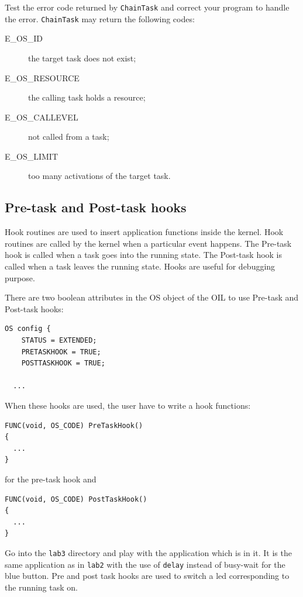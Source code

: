 \documentclass[11pt]{article}
\begin{document}
Test the error code returned by \texttt{ChainTask} and correct your program to
handle the error. \texttt{ChainTask} may return the following codes:

\begin{description}
\item[E_OS_ID] the target task does not exist;
\item[E_OS_RESOURCE] the calling task holds a resource;
\item[E_OS_CALLEVEL] not called from a task;
\item[E_OS_LIMIT] too many activations of the target task.
\end{description}

\subsection{Pre-task and Post-task hooks}

Hook routines are used to insert application functions inside the kernel. Hook routines are called by the kernel when a particular event happens. The Pre-task hook is called when a task goes into the running state. The Post-task hook is called when a task leaves the running state. Hooks are useful for debugging purpose.

There are two boolean attributes in the OS object of the OIL to use Pre-task and Post-task hooks:

\begin{lstlisting}[language=OIL]
  OS config {
    STATUS = EXTENDED;
    PRETASKHOOK = TRUE;
    POSTTASKHOOK = TRUE;
    
  ...
\end{lstlisting}

When these hooks are used, the user have to write a hook functions:

\begin{lstlisting}
FUNC(void, OS_CODE) PreTaskHook()
{
  ...
}
\end{lstlisting}

for the pre-task hook and

\begin{lstlisting}
FUNC(void, OS_CODE) PostTaskHook()
{
  ...
}
\end{lstlisting}


Go into the \texttt{lab3} directory and play with the application which is in it. It is the same application as in \lstinline{lab2} with the use of \lstinline{delay} instead of busy-wait for the blue button. Pre and post task hooks are used to switch a led corresponding to the running task on.
\end{document}
